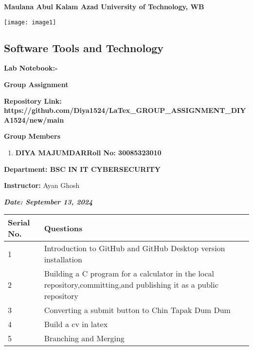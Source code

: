 \documentclass{article} %
\begin{document}


\noindent \textbf{Maulana Abul Kalam Azad University of Technology, WB}

\noindent \textbf{}

\noindent \texttt{[image: image1]}\textbf{}

\noindent \textbf{}

\noindent \textbf{}

\noindent 
\subsection{Software Tools and Technology}

\noindent \textbf{Lab Notebook:-}

\noindent \textbf{}

\noindent \textbf{Group Assignment}

\noindent \textbf{}

\noindent \textbf{}

\noindent \textbf{Repository Link: https://github.com/Diya1524/LaTex\_GROUP\_ASSIGNMENT\_DIYA1524/new/main}

\noindent 

\noindent 

\noindent \textbf{Group Members}

\noindent 

\noindent \textbf{}

\begin{enumerate}
\item \textbf{ DIYA MAJUMDARRoll No: 30085323010   }
\end{enumerate}

\noindent \textbf{Department: BSC IN IT CYBERSECURITY}

\noindent \textbf{}

\noindent \textbf{}

\noindent \textbf{Instructor:  }Ayan Ghosh

\noindent \textbf{\textit{Date: September 13, 2024}}

\noindent \textbf{}

\noindent \textbf{}

\noindent \textbf{}

\begin{tabular}{|p{0.9in}|p{3.3in}|} \hline 
\textbf{Serial No.} & \textbf{Questions} \\ \hline 
1 & Introduction to GitHub and GitHub Desktop version installation \\ \hline 
2 & Building a C program for a calculator in the local repository,committing,and publishing it as a public repository \\ \hline 
3 & Converting a submit button to Chin Tapak Dum Dum \\ \hline 
4 & Build a cv in latex \\ \hline 
5 & Branching and Merging \\ \hline 
\end{tabular}
\end{document}
